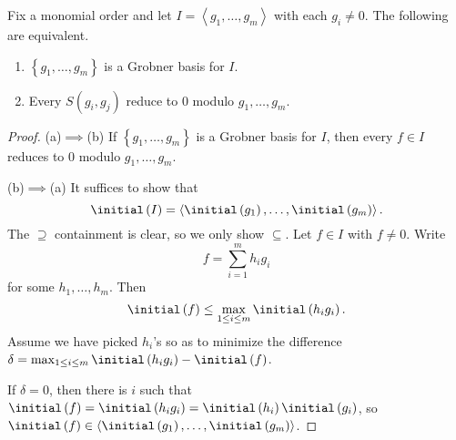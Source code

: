 \documentclass[co439]{subfiles}
\begin{document}
    \begin{theorem}{}
        Fix a monomial order and let $I = \left< g_1,\ldots,g_m \right>$ with each $g_i\neq 0$. The following are equivalent.
        \begin{enumerate}
            \item $\left\lbrace g_1,\ldots,g_m \right\rbrace$ is a Grobner basis for $I$.
            \item Every $S\left( g_i,g_j \right)$ reduce to $0$ modulo $g_1,\ldots,g_m$.
        \end{enumerate}
    \end{theorem}
    
    \begin{proof}
        (a)$\implies$(b) If $\left\lbrace g_1,\ldots,g_m \right\rbrace$ is a Grobner basis for $I$, then every $f\in I$ reduces to $0$ modulo $g_1,\ldots,g_m$.

        (b)$\implies$(a) It suffices to show that
        \begin{equation*}
            \initial\left( I \right) = \left< \initial\left( g_1 \right),\ldots,\initial\left( g_m \right) \right>. 
        \end{equation*}
        The $\supseteq$ containment is clear, so we only show $\subseteq$. Let $f\in I$ with $f\neq 0$. Write
        \begin{equation*}
            f = \sum^{m}_{i=1} h_ig_i
        \end{equation*}
        for some $h_1,\ldots,h_m$. Then
        \begin{equation*}
            \initial\left( f \right) \leq \max_{1\leq i\leq m}\initial\left( h_ig_i \right).
        \end{equation*}
        Assume we have picked $h_i$'s so as to minimize the difference $\delta = \max_{1\leq i\leq m}\initial\left( h_ig_i \right) - \initial\left( f \right)$. 

        If $\delta = 0$, then there is $i$ such that $\initial\left( f \right) = \initial\left( h_ig_i \right) = \initial\left( h_i \right)\initial\left( g_i \right)$, so $\initial\left( f \right)\in\left< \initial\left( g_1 \right),\ldots,\initial\left( g_m \right) \right>$. 


\end{proof}
\end{document}

